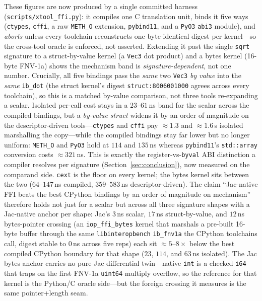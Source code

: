 \documentclass[conference]{IEEEtran}
\newcommand{\code}[1]{\texttt{#1}}
\begin{document}
These figures are now produced by a single committed
harness (\code{scripts/xtool\_ffi.py}): it compiles one C translation unit,
binds it five ways (\code{ctypes}, \code{cffi}, a raw \code{METH\_O} extension,
\code{pybind11}, and a \code{PyO3} \code{abi3} module), and \emph{aborts} unless
every toolchain reconstructs one byte-identical digest per kernel---so the
cross-tool oracle is enforced, not asserted. Extending it past the single
\code{sqrt} signature to a struct-by-value kernel (a \code{Vec3} dot product) and
a bytes kernel (16-byte FNV-1a) shows the mechanism band is
\emph{signature-dependent}, not one number. Crucially, all five bindings pass the
\emph{same} two \code{Vec3} \emph{by value} into the \emph{same} \code{ib\_dot}
(the struct kernel's digest \code{struct:8006001000} agrees across every
toolchain), so this is a matched by-value comparison, not three tools re-expanding
a scalar. Isolated per-call cost stays in a
$23$--$61$\,ns band for the scalar across the compiled bindings, but a
\emph{by-value struct} widens it by an order of magnitude on the descriptor-driven
tools---\code{ctypes} and \code{cffi} pay $\approx$$1.3$ and $\approx$$1.6$\,\textmu s
isolated marshalling the copy---while the compiled bindings stay far lower but no
longer uniform: \code{METH\_O} and \code{PyO3} hold at $114$ and $135$\,ns whereas
\code{pybind11}'s \code{std::array} conversion costs $\approx$$321$\,ns. This is
exactly the register-vs-\code{byval} ABI distinction a compiler
resolves per signature (Section~\ref{sec:conclusion}), now measured on the
comparand side. \code{cext} is the floor on every kernel; the bytes kernel sits
between the two ($64$--$147$\,ns compiled, $359$--$583$\,ns descriptor-driven).
The claim ``Jac-native FFI beats the best CPython bindings by an order of
magnitude on mechanism'' therefore holds not just for a scalar but across all
three signature shapes with a Jac-native anchor per shape: Jac's $3$\,ns scalar,
$17$\,ns struct-by-value, and $12$\,ns bytes-pointer crossing (an
\code{iop\_ffi\_bytes} kernel that marshals a pre-built 16-byte buffer through
the same \code{libinteropbench} \code{ib\_fnv1a} the CPython toolchains call,
digest stable to $0$\,ns across five reps) each sit $\approx$$5$--$8\times$ below
the best compiled CPython boundary for that shape ($23$, $114$, and $63$\,ns
isolated). The Jac bytes anchor carries no pure-Jac differential twin---native
\code{int} is a checked \code{i64} that traps on the first FNV-1a
\code{uint64} multiply overflow, so the reference for that kernel is the
Python/C oracle side---but the foreign crossing it measures is the same
pointer+length seam.
\end{document}
